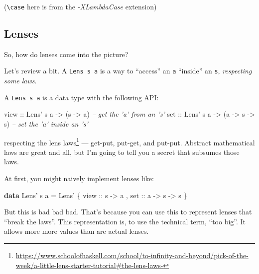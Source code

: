 \documentclass[]{article}
\newenvironment{Shaded}{}{}
\newcommand{\CommentTok}[1]{\textcolor[rgb]{0.38,0.63,0.69}{\textit{#1}}}
\newcommand{\DataTypeTok}[1]{\textcolor[rgb]{0.56,0.13,0.00}{#1}}
\newcommand{\FunctionTok}[1]{\textcolor[rgb]{0.02,0.16,0.49}{#1}}
\newcommand{\KeywordTok}[1]{\textcolor[rgb]{0.00,0.44,0.13}{\textbf{#1}}}
\newcommand{\NormalTok}[1]{#1}
\newcommand{\OtherTok}[1]{\textcolor[rgb]{0.00,0.44,0.13}{#1}}
\renewcommand{\href}[2]{#2\footnote{\url{#1}}}
\begin{document}
(\texttt{\textbackslash{}case} here is from the \emph{-XLambdaCase} extension)

\hypertarget{lenses}{%
\subsection{Lenses}\label{lenses}}

So, how do lenses come into the picture?

Let's review a bit. A \texttt{Lens\textquotesingle{}\ s\ a} is a way to
``access'' an \texttt{a} ``inside'' an \texttt{s}, \emph{respecting some laws}.

A \texttt{Lens\textquotesingle{}\ s\ a} is a data type with the following API:

\begin{Shaded}
\begin{Highlighting}[]
\OtherTok{view ::} \DataTypeTok{Lens'}\NormalTok{ s a }\OtherTok{->}\NormalTok{ (s }\OtherTok{->}\NormalTok{ a)                }\CommentTok{-- get the 'a' from an 's'}
\OtherTok{set  ::} \DataTypeTok{Lens'}\NormalTok{ s a }\OtherTok{->}\NormalTok{ (a }\OtherTok{->}\NormalTok{ s }\OtherTok{->}\NormalTok{ s)           }\CommentTok{-- set the 'a' inside an 's'}
\end{Highlighting}
\end{Shaded}

respecting
\href{https://www.schoolofhaskell.com/school/to-infinity-and-beyond/pick-of-the-week/a-little-lens-starter-tutorial\#the-lens-laws-}{the
lens laws} --- get-put, put-get, and put-put. Abstract mathematical laws are
great and all, but I'm going to tell you a secret that subsumes those laws.

At first, you might naively implement lenses like:

\begin{Shaded}
\begin{Highlighting}[]
\KeywordTok{data} \DataTypeTok{Lens'}\NormalTok{ s a }\FunctionTok{=} \DataTypeTok{Lens'}
\NormalTok{    \{}\OtherTok{ view ::}\NormalTok{ s }\OtherTok{->}\NormalTok{ a}
\NormalTok{    ,}\OtherTok{ set  ::}\NormalTok{ a }\OtherTok{->}\NormalTok{ s }\OtherTok{->}\NormalTok{ s}
\NormalTok{    \}}
\end{Highlighting}
\end{Shaded}

But this is bad bad bad. That's because you can use this to represent lenses
that ``break the laws''. This representation is, to use the technical term,
``too big''. It allows more more values than are actual lenses.
\end{document}
